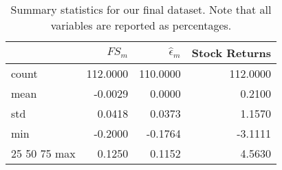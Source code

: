 \begin{table}
\centering
\caption{Summary statistics for our final dataset. Note that all variables are reported as percentages.}
\label{SumStats}
\begin{tabular}{lrrr}
\toprule
{} &  \(FS_m\) &  \(\hat{\epsilon}_m\) &  Stock Returns \\
\midrule
count &  112.0000 &              110.0000 &       112.0000 \\
mean  &   -0.0029 &                0.0000 &         0.2100 \\
std   &    0.0418 &                0.0373 &         1.1570 \\
min   &   -0.2000 &               -0.1764 &        -3.1111 \\
25%
50%
75%
max   &    0.1250 &                0.1152 &         4.5630 \\
\bottomrule
\end{tabular}
\end{table}
